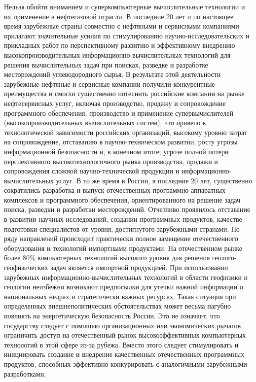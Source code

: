 Нельзя обойти вниманием и суперкомпьютерные вычислительные технологии и их применение в нефтегазовой отрасли.
В последние 20 лет и по настоящее время зарубежные страны совместно с нефтяными и сервисными компаниями прилагают значительные усилия по стимулированию научно-исследовательских и прикладных работ по перспективному развитию и эффективному внедрению высокопроизводительных информационно-вычислительных технологий для решения вычислительных задач при поисках, разведке и разработке месторождений углеводородного сырья.
В результате этой деятельности зарубежные нефтяные и сервисные компании получили конкурентные преимущества и смогли существенно потеснить российские компании на рынке нефтесервисных услуг, включая производство, продажу и сопровождение программного обеспечения, производство и применение супервычислителей (высокопроизводительных вычислительных систем), что привело к технологической зависимости российских организаций, высокому уровню затрат на сопровождение, отставанию в научно-техническом развитии, росту угрозы информационной безопасности и, в конечном итоге, угрозе полной потери перспективного высокотехнологичного рынка производства, продажи и сопровождения сложной научно-технической продукции и информационно-вычислительных услуг.
В то же время в России, в последние 20 лет, существенно сократились разработка и выпуск отечественных программно-аппаратных комплексов и программного обеспечения, ориентированного на решение задач поиска, разведки и разработки месторождений.
Отчетливо проявилось отставание в развитии научных исследований, создании программных продуктов, качестве подготовки специалистов от уровня, достигнутого зарубежными странами.
По ряду направлений происходит практически полное замещение отечественного оборудования и технологий импортными продуктами.
На отечественном рынке более 80\% компьютерных технологий высокого уровня для решения геолого-геофизических задач является импортной продукцией.
При использовании зарубежных информационно-вычислительных технологий в области геофизики и геологии неизбежно возникают предпосылки для утечки важной информации о национальных недрах и стратегически важных ресурсах.
Такая ситуация при определенных внешнеполитических обстоятельствах может весьма пагубно повлиять на энергетическую безопасность России.
Это не означает, что государству следует с помощью организационных или экономических рычагов ограничить доступ на отечественный рынок высокоэффективных компьютерных технологий в этой сфере из-за рубежа.
Вместо этого следует стимулировать и инициировать создание и внедрение качественных отечественных программных продуктов, способных эффективно конкурировать с аналогичными зарубежными разработками.
